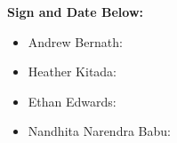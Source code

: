 \documentclass[12pt]{article}
\begin{document}
\textbf{Sign and Date Below: }
\begin{itemize}
\item Andrew Bernath: 

\item Heather Kitada: 

\item Ethan Edwards: 

\item Nandhita Narendra Babu:
\end{itemize}








\end{document}
